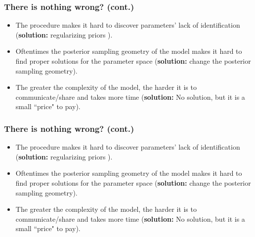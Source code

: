 \documentclass[arial,12pt,xcolor=dvipsnames]{beamer}
\begin{document}
%
\begin{frame}
	\frametitle{There is nothing wrong? (cont.)}
	\begin{itemize}
		\item The procedure makes it hard to discover parameters' lack of identification \cite{Skrondal_et_al_2004a} (\textbf{solution:} regularizing priors ).
		\item Oftentimes the posterior sampling geometry of the model makes it hard to find proper solutions for the parameter space \cite{Betancourt_et_al_2013} (\textbf{solution:} change the posterior sampling geometry).
		\item The greater the complexity of the model, the harder it is to communicate/share and takes more time
		(\textbf{solution:} No solution, but it is a small ``price" to pay).
	\end{itemize}
\end{frame}
%
\begin{frame}
	\frametitle{There is nothing wrong? (cont.)}
	\begin{itemize}
		\item The procedure makes it hard to discover parameters' lack of identification \cite{Skrondal_et_al_2004a} (\textbf{solution:} regularizing priors ).
		\item Oftentimes the posterior sampling geometry of the model makes it hard to find proper solutions for the parameter space \cite{Betancourt_et_al_2013} (\textbf{solution:} change the posterior sampling geometry).
		\item The greater the complexity of the model, the harder it is to communicate/share and takes more time
		(\textbf{solution:} No solution, but it is a small ``price" to pay).
	\end{itemize}
\end{frame}
%
\end{document}
